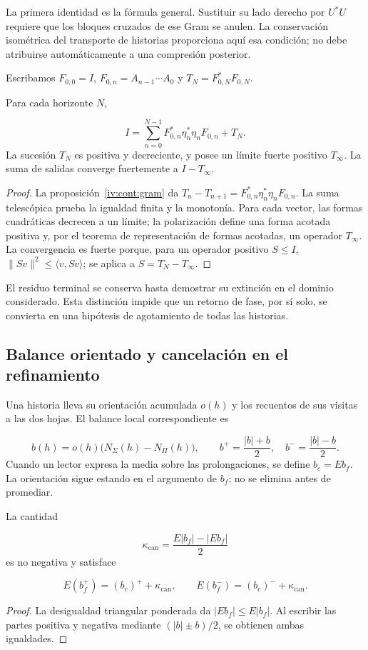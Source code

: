 La primera identidad es la fórmula general. Sustituir su lado derecho por \(U^*U\) requiere que los bloques cruzados de ese Gram se anulen. La conservación isométrica del transporte de historias proporciona aquí esa condición; no debe atribuirse automáticamente a una compresión posterior.

Escribamos \(F_{0,0}=I\), \(F_{0,n}=A_{n-1}\cdots A_0\) y \(T_N=F_{0,N}^*F_{0,N}\).

\begin{theorem}
\label{iv:cont:terminal}
Para cada horizonte \(N\),

\[
I=\sum_{n=0}^{N-1}
F_{0,n}^*\eta_n^*\eta_nF_{0,n}+T_N.
\]
La sucesión \(T_N\) es positiva y decreciente, y posee un límite fuerte positivo \(T_\infty\). La suma de salidas converge fuertemente a \(I-T_\infty\).

\end{theorem}
\begin{proof}
La proposición~\ref{iv:cont:gram} da \(T_n-T_{n+1}=F_{0,n}^*\eta_n^*\eta_nF_{0,n}\). La suma telescópica prueba la igualdad finita y la monotonía. Para cada vector, las formas cuadráticas decrecen a un límite; la polarización define una forma acotada positiva y, por el teorema de representación de formas acotadas, un operador \(T_\infty\). La convergencia es fuerte porque, para un operador positivo \(S\leq I\), \(\|Sv\|^2\leq\langle v,Sv\rangle\); se aplica a \(S=T_N-T_\infty\).
\end{proof}

El residuo terminal se conserva hasta demostrar su extinción en el dominio considerado. Esta distinción impide que un retorno de fase, por sí solo, se convierta en una hipótesis de agotamiento de todas las historias.

\subsection{Balance orientado y cancelación en el refinamiento}
\label{iv:cont:balance}
Una historia lleva su orientación acumulada \(o(h)\) y los recuentos de sus visitas a las dos hojas. El balance local correspondiente es

\[
b(h)=o(h)\bigl(N_\Sigma(h)-N_\Pi(h)\bigr),
\qquad
b^+=\frac{|b|+b}{2},\quad b^-=\frac{|b|-b}{2}.
\]
Cuando un lector expresa la media sobre las prolongaciones, se define \(b_c=Eb_f\). La orientación sigue estando en el argumento de \(b_f\); no se elimina antes de promediar.

\begin{proposition}
\label{iv:cont:cancelacion}
La cantidad

\[
\kappa_{\mathrm{can}}=
\frac{E|b_f|-|Eb_f|}{2}
\]
es no negativa y satisface

\[
E(b_f^+)=(b_c)^++\kappa_{\mathrm{can}},
\qquad
E(b_f^-)=(b_c)^-+\kappa_{\mathrm{can}}.
\]
\end{proposition}
\begin{proof}
La desigualdad triangular ponderada da \(|Eb_f|\leq E|b_f|\). Al escribir las partes positiva y negativa mediante \((|b|\pm b)/2\), se obtienen ambas igualdades.
\end{proof}

